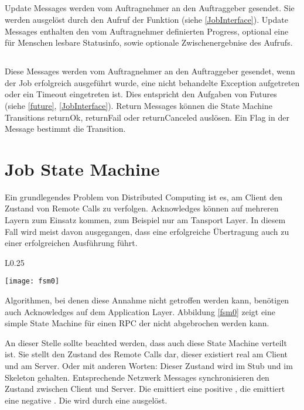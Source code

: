 \subsection{\UpdateMessage{}}
Update Messages werden vom Auftragnehmer an den Auftraggeber gesendet.
Sie werden ausgelöst durch den Aufruf der \JobUpdate{} Funktion (siehe \ref{JobInterface}).
Update Messages enthalten den vom Auftragnehmer definierten Progress, optional eine für Menschen lesbare Statusinfo, sowie optionale Zwischenergebnise des Aufrufs.

\subsection{\ReturnMessage{}}
Diese Messages werden vom Auftragnehmer an den Auftraggeber gesendet, wenn der Job erfolgreich ausgeführt wurde, eine nicht behandelte Exception aufgetreten oder ein Timeout eingetreten ist.
Dies entspricht den Aufgaben von Futures (siehe \ref{future}, \ref{JobInterface}).
Return Messages können die State Machine Transitions returnOk, returnFail oder returnCanceled auslösen.
Ein Flag in der Message bestimmt die Transition.




\section{Job State Machine}
\label{jfsm}
Ein grundlegendes Problem von Distributed Computing ist es, am Client den Zustand von Remote Calls zu verfolgen.
Acknowledges können auf mehreren Layern zum Einsatz kommen, zum Beispiel nur am Tansport Layer.
In diesem Fall wird meist davon ausgegangen, dass eine erfolgreiche Übertragung auch zu einer erfolgreichen Ausführung führt.
\begin{wrapfigure}{L}{0.25\textwidth}
  \vspace{-20pt}
  \begin{center}
    \texttt{[image: fsm0]}
  \end{center}
  \caption{State Machine eines nicht abbrechbaren RPC}
  \label{fsm0}
\end{wrapfigure}
Algorithmen, bei denen diese Annahme nicht getroffen werden kann, benötigen auch Acknowledges auf dem Application Layer.
Abbildung \ref{fsm0} zeigt eine simple State Machine für einen RPC der nicht abgebrochen werden kann.

An dieser Stelle sollte beachted werden, dass auch diese State Machine verteilt ist.
Sie stellt den Zustand des Remote Calls dar, dieser existiert real am Client und am Server.
Oder mit anderen Worten: Dieser Zustand wird im Stub und im Skeleton gehalten.
Entsprechende Netzwerk Messages synchronisieren den Zustand zwischen Client und Server.
Die \TransReturnOk{} emittiert eine positive \ReturnMessage{}, die \TransReturnFail{} emittiert eine negative \ReturnMessage{}.
Die \TransCall{} wird durch eine \CallMessage{} ausgelöst.

